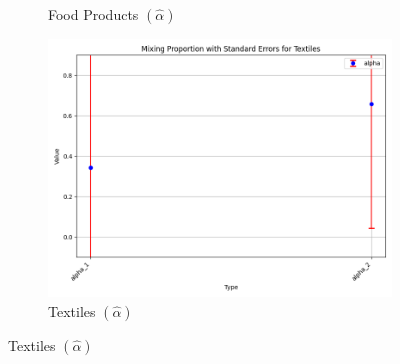 \documentclass{article}
\begin{document}
\begin{figure}[ht!]
\begin{subfigure}[t]{0.32\textwidth}
        \caption{Food Products  $(\hat\alpha)$}
    \end{subfigure}
    \begin{subfigure}[t]{0.32\textwidth}
        \centering
        \includegraphics[width=\textwidth]{figure/empirical_stat_mixture_kmshare_ciiu_alpha_with_error_bars_Textiles.png}
        \caption{Textiles $(\hat\alpha)$}
    \end{subfigure}


\end{figure}
\end{document}
